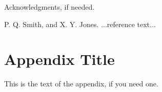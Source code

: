 \documentclass[preprint,authoryear]{sigplanconf}
\begin{document}
\acks

Acknowledgments, if needed.





\begin{thebibliography}{}
\softraggedright

P. Q. Smith, and X. Y. Jones. ...reference text...

\end{thebibliography}

\appendix
\section{Appendix Title}

This is the text of the appendix, if you need one.
\end{document}
